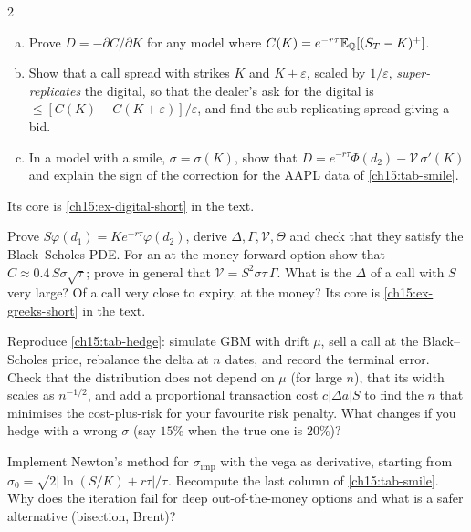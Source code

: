 \begin{paracol}{2}
\begin{exercise}\label{ch15:ex-digital}
\leavevmode
\begin{enumerate}[(a)]
  \item Prove $D=-\partial C/\partial K$ for any model where $C(K)=e^{-r\tau}\mathbb{E}_{\mathbb{Q}}[(S_T-K)^+]$.
  \item Show that a call spread with strikes $K$ and $K+\varepsilon$, scaled by $1/\varepsilon$, \emph{super-replicates} the digital,
      so that the dealer's ask for the digital is $\le[C(K)-C(K+\varepsilon)]/\varepsilon$, and find the sub-replicating spread giving a bid.
  \item In a model with a smile, $\sigma=\sigma(K)$, show that $D=e^{-r\tau}\Phi(d_2)-\mathcal V\,\sigma'(K)$ and explain the sign
      of the correction for the AAPL data of \cref{ch15:tab-smile}.
\end{enumerate}
Its core is \cref{ch15:ex-digital-short} in the text.
\end{exercise}

\begin{exercise}\label{ch15:ex-greeks}
Prove $S\varphi(d_1)=Ke^{-r\tau}\varphi(d_2)$, derive $\Delta,\Gamma,\mathcal V,\Theta$ and check that they satisfy the Black--Scholes PDE. For an at-the-money-forward option show that $C\approx0.4\,S\sigma\sqrt\tau$; prove in general that $\mathcal V=S^2\sigma\tau\,\Gamma$. What is the $\Delta$ of a call with $S$ very large? Of a call very close to expiry, at the money?
Its core is \cref{ch15:ex-greeks-short} in the text.
\end{exercise}

\begin{exercise}\label{ch15:ex-hedge}
Reproduce \cref{ch15:tab-hedge}: simulate GBM with drift $\mu$, sell a call at the Black--Scholes price, rebalance the delta at $n$ dates, and record the terminal error. Check that the distribution does not depend on $\mu$ (for large $n$),
that its width scales as $n^{-1/2}$, and add a proportional transaction cost $c|\Delta a|S$ to find the $n$ that minimises the cost-plus-risk for your favourite risk penalty. What changes if you hedge with a wrong $\sigma$ (say $15\%$ when the true one is $20\%$)?
\end{exercise}

\begin{exercise}\label{ch15:ex-iv}
Implement Newton's method for $\sigma_{\mathrm{imp}}$ with the vega as derivative, starting from $\sigma_0=\sqrt{2|\ln(S/K)+r\tau|/\tau}$. Recompute the last column of \cref{ch15:tab-smile}. Why does the iteration fail for deep out-of-the-money options and what is a safer alternative (bisection, Brent)?
\end{exercise}


\end{paracol}
